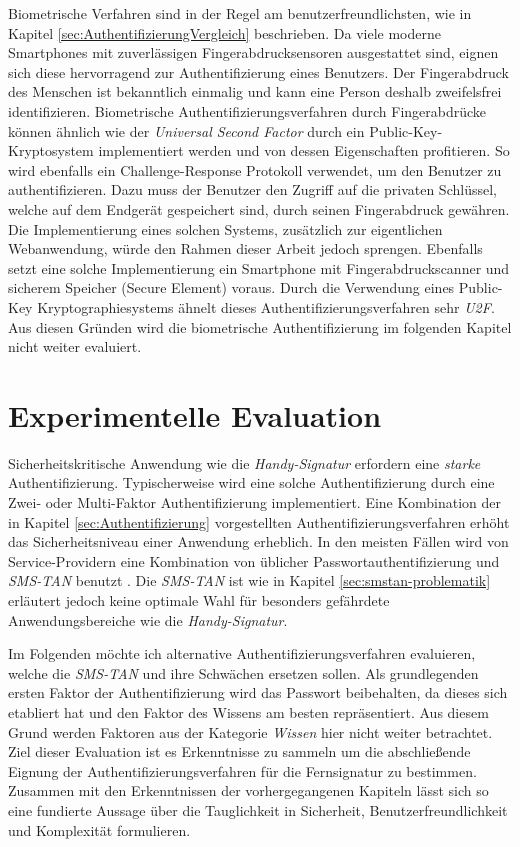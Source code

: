 \documentclass[11pt,a4paper,ngerman]{scrreprt}
\begin{document}
Biometrische Verfahren sind in der Regel am benutzerfreundlichsten, wie in Kapitel \ref{sec:AuthentifizierungVergleich} beschrieben. Da viele moderne Smartphones mit zuverlässigen Fingerabdrucksensoren ausgestattet sind, eignen sich diese hervorragend zur Authentifizierung eines Benutzers. Der Fingerabdruck des Menschen ist bekanntlich einmalig und kann eine Person deshalb zweifelsfrei identifizieren. Biometrische Authentifizierungsverfahren durch Fingerabdrücke können ähnlich wie der \textit{Universal Second Factor} durch ein Public-Key-Kryptosystem implementiert werden und von dessen Eigenschaften profitieren. So wird ebenfalls ein Challenge-Response Protokoll verwendet, um den Benutzer zu authentifizieren. Dazu muss der Benutzer den Zugriff auf die privaten Schlüssel, welche auf dem Endgerät gespeichert sind, durch seinen Fingerabdruck gewähren. Die Implementierung eines solchen Systems, zusätzlich zur eigentlichen Webanwendung, würde den Rahmen dieser Arbeit jedoch sprengen. Ebenfalls setzt eine solche Implementierung ein Smartphone mit Fingerabdruckscanner und sicherem Speicher (Secure Element) voraus. Durch die Verwendung eines Public-Key Kryptographiesystems ähnelt dieses Authentifizierungsverfahren sehr \textit{U2F}. Aus diesen Gründen wird die biometrische Authentifizierung im folgenden Kapitel nicht weiter evaluiert.

\chapter{Experimentelle Evaluation}
Sicherheitskritische Anwendung wie die \textit{Handy-Signatur} erfordern eine \emph{starke} Authentifizierung. Typischerweise wird eine solche Authentifizierung durch eine Zwei- oder Multi-Faktor Authentifizierung implementiert. Eine Kombination der in Kapitel \ref{sec:Authentifizierung} vorgestellten Authentifizierungsverfahren erhöht das Sicherheitsniveau einer Anwendung erheblich. In den meisten Fällen wird von Service-Providern eine Kombination von üblicher Passwortauthentifizierung und \textit{SMS-TAN} benutzt \cite{fido17}. Die \textit{SMS-TAN} ist wie in Kapitel \ref{sec:smstan-problematik} erläutert jedoch keine optimale Wahl für besonders gefährdete Anwendungsbereiche wie die \textit{Handy-Signatur}.

Im Folgenden möchte ich alternative Authentifizierungsverfahren evaluieren, welche die \textit{SMS-TAN} und ihre Schwächen ersetzen sollen. Als grundlegenden ersten Faktor der Authentifizierung wird das Passwort beibehalten, da dieses sich etabliert hat und den Faktor des Wissens am besten repräsentiert. Aus diesem Grund werden Faktoren aus der Kategorie \emph{Wissen} hier nicht weiter betrachtet. Ziel dieser Evaluation ist es Erkenntnisse zu sammeln um die abschließende Eignung der Authentifizierungsverfahren für die Fernsignatur zu bestimmen. Zusammen mit den Erkenntnissen der vorhergegangenen Kapiteln lässt sich so eine fundierte Aussage über die Tauglichkeit in Sicherheit, Benutzerfreundlichkeit und Komplexität formulieren.
\end{document}
